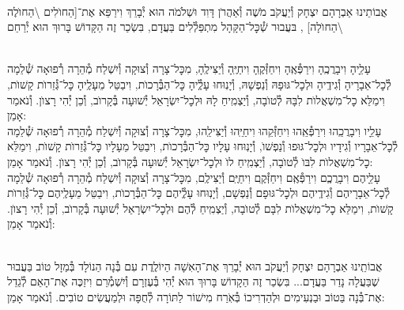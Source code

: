 \documentclass[twoside, openany, parskip=half, 11pt]{book}
\begin{document}
\begin{small}

\\
אֲבוֹתֵינוּ אַבְרָהָם יִצְחָק וְ֯יַעֲקֹב מֹשֶׁה וְ֯אַהֲרֹן דָּוִד וּשְׁלֹמֹה הוּא יְ֯בָרֵךְ וִירַפֵּא אֶת־[הַחוׂלִים \textbackslash הַחוׂלֶה \textbackslash הַחוׂלָה]
,
בּעֲבוּר שְׁ֯כׇּל־הַקָּהָל מִתְפַּלְ֯לִים בַּעֲדָם, בִּשְׂכַר זֶה
הַקָּדוֹשׁ בָּרוּךְ הוּא יְ֯רַחֵם
\setcolumnwidth{1.4in,1.4in,1.4in}
\begin{paracol}{3}
\\
עָלֵָיהָ וִיבָרֲכֶֽהָ וִירַפְּ֯אֶֽהָ וִיחַזְּ֯קֶֽהָ וִיחַיֶּֽהָ וְ֯יַצִּילֶֽהָ, מִכׇּל־צָרָה וְ֯צוּקָה וְ֯יִשְׁלַח מְ֯הֵרָה רְ֯פוּאָה שְׁ֯לֵמָה לְ֯כׇל־אֵבָרָיהָ וְ֯גִידֶֽיהָ וּלְכׇל־גּוּפָהּ וְ֯נַפְשָׁהּ, וְ֯יָנֽוּחוּ עָלְֶ֯יהָ כׇּל־הַבְּ֯רָכוׂת, וִיבַטֵּל מֵעָלֶֽיהָ כׇּל־גְּ֯זֵרוׂת קָשׁוׂת, וִימַלֵּא כׇל־מִשְׁאֲלוׂת לִבָּהּ לְ֯טוׂבָה, וְ֯יַצְמִֽיחַ לָהּ וּלְכׇל־יִשְׂרָאֵל יְ֯שׁוּעָה בְּ֯קָרוׂב, וְ֯כֵן יְ֯הִי רָצוׂן. וְ֯נֹאמַר אָמֵן:
\switchcolumn
{}\\
עָלֵָיו וִיבָרֲכֵֽהוּ וִירַפְּ֯אֵֽהוּ וִיחַזְּ֯קֵהוּ וִיחַיֵּֽהוּ וְ֯יַצִּילֵֽהוּ, מִכׇּל־צָרָה וְ֯צוּקָה וְ֯יִשְׁלַח מְ֯הֵרָה רְ֯פוּאָה שְׁ֯לֵמָה לְ֯כׇל־אֵבָרָיו וְ֯גִידָיו וּלְכׇל־גּוּפוּ וְ֯נַפְשׁוׂ, וְ֯יָנֽוּחוּ עָלָיו כׇּל־הַבְּ֯רָכוׂת, וִיבַטֵּל מֵעָלָיו כׇּל־גְּ֯זֵרוׂת קָשׁוׂת, וִימַלֵּא כׇל־מִשְׁאֲלוׂת לִבּוׂ לְ֯טוׂבָה, וְ֯יַצְמִֽיחַ לוׂ וּלְכׇל־יִשְׂרָאֵל יְ֯שׁוּעָה בְּ֯קָרוׂב, וְ֯כֵן יְ֯הִי רָצוׂן. וְ֯נֹאמַר אָמֵן:
\switchcolumn
{}\\
עָלֵָיהֶם וִיבָרֲכְֶם וִירַפְּ֯אֶֽם וִיחַזְּ֯קֶֽם וִיחַיֶּֽם וְ֯יַצִּילֶֽם, מִכׇּל־צָרָה וְ֯צוּקָה וְ֯יִשְׁלַח מְ֯הֵרָה רְ֯פוּאָה שְׁ֯לֵמָה לְ֯כׇל־אֵבָרָיהֶם וְ֯גִידֶֽיהֶם וּלְכׇל־גּוּפָם וְ֯נַפְשָׁם, וְ֯יָנֽוּחוּ עָלְֶ֯יהֶם כׇּל־הַבְּ֯רָכוׂת, וִיבַטֵּל מֵעָלֶֽיהֶם כׇּל־גְּ֯זֵרוׂת קָשׁוׂת, וִימַלֵּא כׇל־מִשְׁאֲלוׂת לִבָּם לְ֯טוׂבָה, וְ֯יַצְמִֽיחַ לְ֯הֶם וּלְכׇל־יִשְׂרָאֵל יְ֯שׁוּעָה בְּ֯קָרוׂב, וְ֯כֵן יְ֯הִי רָצוׂן. וְ֯נֹאמַר אָמֵן:
\end{paracol}

\vspace{\baselineskip}

\\
אֲבוֹתֵֽינוּ אַבְרָהָם יִצְחָק וְ֯יַעֲקֹב הוּא יְ֯בָרֵךְ אֶת־הָאִשָׁה הַיוֹלֶֽדֶת
עִם בְּ֯נָה הַנוֹלָד בְּ֯מַזָל טוֹב בַּעֲבוּר שֶׁבַּעֲלָה נָדַר בַּעֲדָם... בִּשְׂכַר זֶה הַקָדוֹשׁ בָּרוּךְ הוּא יְ֯הִי בְּ֯עֶזְרָם וְ֯יִשְׁמְ֯רֵם וִיזַכֶּה אֶת־הָאֵם לְ֯גַדֵל אֶת־בְּ֯נָה בַּטוֹב וּבַנְעִימִים וּלְהַדְרִיכוֹ בְּ֯אֹֽרַח מִישׁוֹר לַתּוֹרָה לְ֯חֻפָּה וּלְמַעֲשִׂים טוֹבִים. וְ֯נֹאמַר אָמֵן:


\end{small}
\end{document}
